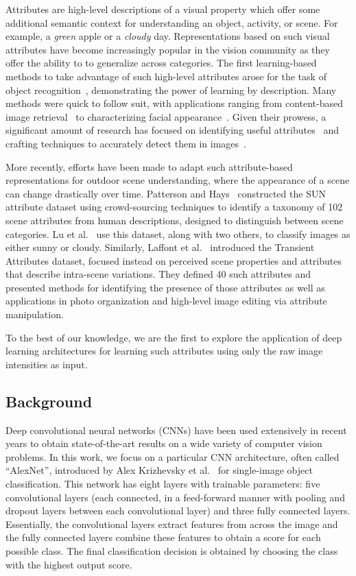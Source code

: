 \documentclass{article}
\begin{document}
Attributes are high-level descriptions of a visual property
which offer some additional semantic context for understanding an
object, activity, or scene. For example, a \emph{green} apple or a
\emph{cloudy} day. Representations based on such visual attributes
have become increasingly popular in the vision community as they offer
the ability to to generalize across categories. The first
learning-based methods to take advantage of such high-level attributes
arose for the task of object
recognition~\cite{farhadi2009describing,lampert2009learning},
demonstrating the power of learning by description. Many methods were
quick to follow suit, with applications ranging from content-based
image retrieval~\cite{siddiquie2011image} to characterizing facial
appearance~\cite{kumar2011describable}. Given their prowess, a
significant amount of research has focused on identifying useful
attributes~\cite{berg2010automatic} and crafting techniques to
accurately detect them in images~\cite{vedaldi2014understanding}. 

More recently, efforts have been made to adapt such attribute-based
representations for outdoor scene understanding, where the appearance
of a scene can change drastically over time.  Patterson and
Hays~\cite{patterson2012sun} constructed the SUN attribute dataset
using crowd-sourcing techniques to identify a taxonomy of 102 scene
attributes from human descriptions, designed to distinguish between
scene categories. Lu et al.~\cite{lutwoclass} use this dataset, along
with two others, to classify images as either sunny or cloudy.
Similarly, Laffont et al.~\cite{Laffont14} introduced the
Transient Attributes dataset, focused instead on perceived scene
properties and attributes that describe intra-scene variations. They
defined 40 such attributes and presented methods for identifying the
presence of those attributes as well as applications in photo
organization and high-level image editing via attribute manipulation. 

To the best of our knowledge, we are the first to explore the
application of deep learning architectures for learning such
attributes using only the raw image intensities as input.

\subsection{Background}
\indent

Deep convolutional neural networks (CNNs) have been used extensively
in recent years to obtain state-of-the-art results on a wide variety
of computer vision problems.  In this work, we focus on a particular
CNN architecture, often called ``AlexNet'', introduced by Alex
Krizhevsky et al.~\cite{caffenetnips12} for single-image object
classification. This network has eight layers with trainable
parameters: five convolutional layers (each connected, in a
feed-forward manner with pooling and dropout layers between each
convolutional layer) and three fully connected layers. Essentially,
the convolutional layers extract features from across the image and
the fully connected layers combine these features to obtain a score
for each possible class. The final classification decision is obtained
by choosing the class with the highest output score.
\end{document}
